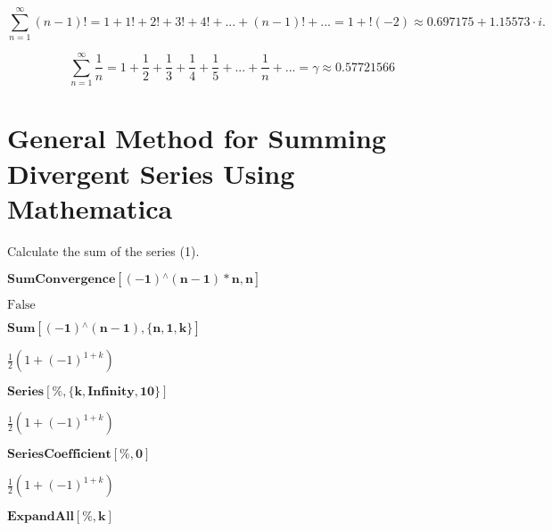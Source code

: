 \documentclass[12pt]{article}
\begin{document}
\begin{equation}
\sum_{n=1}^{\infty} (n-1)! = 1+1!+2!+3!+4!+...+(n-1)!+... = 1+!(-2)\approx 0.697175 + 1.15573 \cdot i.
\end{equation}

\begin{equation}
\sum_{n=1}^{\infty} \frac{1}{n} = 1+\frac{1}{2}+\frac{1}{3}+\frac{1}{4}+\frac{1}{5}+...+\frac{1}{n}+... = \gamma\approx 0.57721566
\end{equation}

\section{General Method for Summing Divergent Series Using Mathematica}

Calculate the sum of the series (1).

 \begin{doublespace}
\noindent\(\pmb{\text{SumConvergence}[(-1){}^{\wedge}(n-1)*n,n]}\)
\end{doublespace}

\begin{doublespace}
\noindent\(\text{False}\)
\end{doublespace}

\begin{doublespace}
\noindent\(\pmb{\text{Sum}[(-1){}^{\wedge}(n-1),\{n,1,k\}]}\)
\end{doublespace}

\begin{doublespace}
\noindent\(\frac{1}{2} (1+(-1)^{1+k})\)
\end{doublespace}

\begin{doublespace}
\noindent\(\pmb{\text{Series}[\%,\{k,\text{Infinity},10\}]}\)
\end{doublespace}

\begin{doublespace}
\noindent\(\frac{1}{2} (1+(-1)^{1+k})\)
\end{doublespace}

\begin{doublespace}
\noindent\(\pmb{\text{SeriesCoefficient}[\%,0]}\)
\end{doublespace}

\begin{doublespace}
\noindent\(\frac{1}{2} (1+(-1)^{1+k})\)
\end{doublespace}

\begin{doublespace}
\noindent\(\pmb{\text{ExpandAll}[\%, k]}\)
\end{doublespace}
\end{document}
